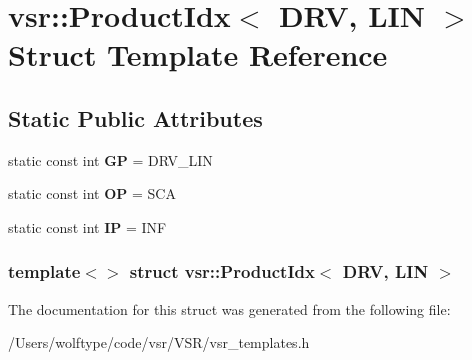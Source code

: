 \hypertarget{structvsr_1_1_product_idx_3_01_d_r_v_00_01_l_i_n_01_4}{\section{vsr\-:\-:Product\-Idx$<$ D\-R\-V, L\-I\-N $>$ Struct Template Reference}
\label{structvsr_1_1_product_idx_3_01_d_r_v_00_01_l_i_n_01_4}
}
\subsection*{Static Public Attributes}
\begin{DoxyCompactItemize}
\item 
\hypertarget{structvsr_1_1_product_idx_3_01_d_r_v_00_01_l_i_n_01_4_a01e4a63be892a7937679ef3b6eee41eb}{static const int {\bfseries G\-P} = D\-R\-V\-\_\-\-L\-I\-N}\label{structvsr_1_1_product_idx_3_01_d_r_v_00_01_l_i_n_01_4_a01e4a63be892a7937679ef3b6eee41eb}

\item 
\hypertarget{structvsr_1_1_product_idx_3_01_d_r_v_00_01_l_i_n_01_4_a63ff6c19419428313e8a87c66ea9440b}{static const int {\bfseries O\-P} = S\-C\-A}\label{structvsr_1_1_product_idx_3_01_d_r_v_00_01_l_i_n_01_4_a63ff6c19419428313e8a87c66ea9440b}

\item 
\hypertarget{structvsr_1_1_product_idx_3_01_d_r_v_00_01_l_i_n_01_4_aed59a2b2a3f29ae6b517f318c4a79f20}{static const int {\bfseries I\-P} = I\-N\-F}\label{structvsr_1_1_product_idx_3_01_d_r_v_00_01_l_i_n_01_4_aed59a2b2a3f29ae6b517f318c4a79f20}

\end{DoxyCompactItemize}
\subsubsection*{template$<$$>$ struct vsr\-::\-Product\-Idx$<$ D\-R\-V, L\-I\-N $>$}



The documentation for this struct was generated from the following file\-:\begin{DoxyCompactItemize}
\item 
/\-Users/wolftype/code/vsr/\-V\-S\-R/vsr\-\_\-templates.\-h\end{DoxyCompactItemize}
